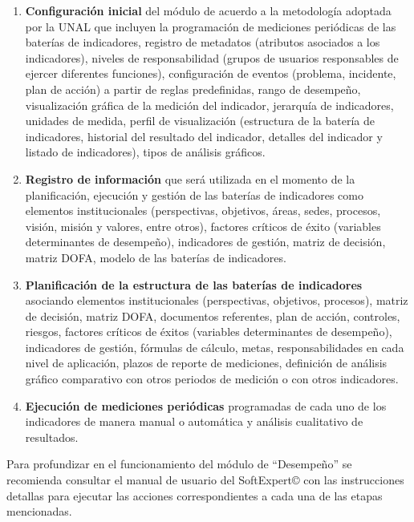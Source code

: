 \documentclass[
]{book}
\begin{document}
\begin{enumerate}
\def\labelenumi{\arabic{enumi}.}
\item
  \textbf{Configuración inicial} del módulo de acuerdo a la metodología adoptada por la UNAL que incluyen la programación de mediciones periódicas de las baterías de indicadores, registro de metadatos (atributos asociados a los indicadores), niveles de responsabilidad (grupos de usuarios responsables de ejercer diferentes funciones), configuración de eventos (problema, incidente, plan de acción) a partir de reglas predefinidas, rango de desempeño, visualización gráfica de la medición del indicador, jerarquía de indicadores, unidades de medida, perfil de visualización (estructura de la batería de indicadores, historial del resultado del indicador, detalles del indicador y listado de indicadores), tipos de análisis gráficos.
\item
  \textbf{Registro de información} que será utilizada en el momento de la planificación, ejecución y gestión de las baterías de indicadores como elementos institucionales (perspectivas, objetivos, áreas, sedes, procesos, visión, misión y valores, entre otros), factores críticos de éxito (variables determinantes de desempeño), indicadores de gestión, matriz de decisión, matriz DOFA, modelo de las baterías de indicadores.
\item
  \textbf{Planificación de la estructura de las baterías de indicadores} asociando elementos institucionales (perspectivas, objetivos, procesos), matriz de decisión, matriz DOFA, documentos referentes, plan de acción, controles, riesgos, factores críticos de éxitos (variables determinantes de desempeño), indicadores de gestión, fórmulas de cálculo, metas, responsabilidades en cada nivel de aplicación, plazos de reporte de mediciones, definición de análisis gráfico comparativo con otros periodos de medición o con otros indicadores.
\item
  \textbf{Ejecución de mediciones periódicas} programadas de cada uno de los indicadores de manera manual o automática y análisis cualitativo de resultados.
\end{enumerate}

Para profundizar en el funcionamiento del módulo de ``Desempeño'' se recomienda consultar el manual de usuario del SoftExpert© con las instrucciones detallas para ejecutar las acciones correspondientes a cada una de las etapas mencionadas.
\end{document}

